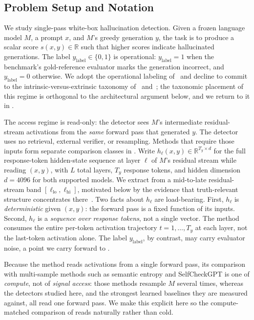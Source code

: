 \subsection{Problem Setup and Notation}
\label{subsec:hd:setup}

We study single-pass white-box hallucination detection. Given a frozen language
model $M$, a prompt $x$, and $M$'s greedy generation $y$, the task is to produce
a scalar score $s(x,y) \in \mathbb{R}$ such that higher scores indicate
hallucinated generations. The label $y_{\mathrm{label}} \in \{0,1\}$ is
operational: $y_{\mathrm{label}} = 1$ when the benchmark's gold-reference
evaluator marks the generation incorrect, and $y_{\mathrm{label}} = 0$
otherwise. We adopt the operational labeling of~\citet{barshalom2025actvit} and
decline to commit to the intrinsic-versus-extrinsic taxonomy
of~\citet{ji2022survey} and~\citet{bang2025hallulens}; the taxonomic placement of
this regime is orthogonal to the architectural argument below, and we return to
it in .

The access regime is read-only: the detector sees $M$'s intermediate
residual-stream activations from the \emph{same} forward pass that generated
$y$. The detector uses no retrieval, external verifier, or resampling. Methods
that require those inputs form separate comparison classes in . Write
$h_\ell(x,y) \in \mathbb{R}^{T_y \times d}$ for the full response-token
hidden-state sequence at layer $\ell$ of $M$'s residual stream while reading
$(x,y)$, with $L$ total layers, $T_y$ response tokens, and hidden dimension
$d = 4096$ for both supported models. We extract from a mid-to-late residual-
stream band $[\ell_{\mathrm{lo}}, \ell_{\mathrm{hi}}]$, motivated below by the
evidence that truth-relevant structure concentrates there~\citep{li2023iti,marks2024geometry}.
Two facts about $h_\ell$ are load-bearing. First, $h_\ell$ is \emph{deterministic}
given $(x,y)$: the forward pass is a fixed function of its inputs. Second,
$h_\ell$ is a \emph{sequence over response tokens}, not a single vector. The
method consumes the entire per-token activation trajectory $t = 1,\ldots,T_y$ at
each layer, not the last-token activation alone. The label $y_{\mathrm{label}}$,
by contrast, may carry evaluator noise, a point we carry forward to
.

Because the method reads activations from a single forward pass, its comparison
with multi-sample methods such as semantic entropy and SelfCheckGPT is one of
\emph{compute}, not of \emph{signal access}: those methods resample $M$ several
times, whereas the detectors studied here, and the strongest learned baselines
they are measured against, all read one forward pass. We make this explicit here
so the compute-matched comparison of  reads naturally rather
than cold.

